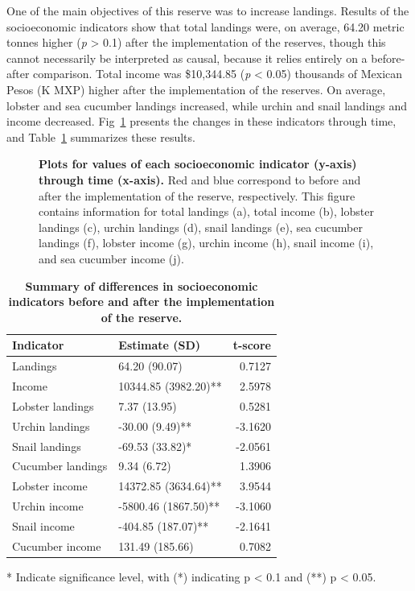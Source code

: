 \documentclass[10pt,letterpaper]{article}
\begin{document}
One of the main objectives of this reserve was to increase landings. Results of the socioeconomic indicators show that total landings were, on average, 64.20 metric tonnes higher (\emph{p} \textgreater{} 0.1) after the implementation of the reserves, though this cannot necessarily be interpreted as causal, because it relies entirely on a before-after comparison. Total income was \$10,344.85 (\emph{p} \textless{} 0.05) thousands of Mexican Pesos (K MXP) higher after the implementation of the reserves. On average, lobster and sea cucumber landings increased, while urchin and snail landings and income decreased. Fig~\ref{fig6} presents the changes in these indicators through time, and Table~\ref{table4} summarizes these results.

\begin{figure}[!h]
\caption{{\bf Plots for values of each socioeconomic indicator (y-axis) through time (x-axis).}
Red and blue correspond to before and after the implementation of the reserve, respectively. This figure contains information for total landings (a), total income (b), lobster landings (c), urchin landings (d), snail landings (e), sea cucumber landings (f), lobster income (g), urchin income (h), snail income (i), and sea cucumber income (j).}
\label{fig6}
\end{figure}

\begin{table}[!ht]
\centering
\caption{
{\bf Summary of differences in socioeconomic indicators before and after the implementation of the reserve.}}
\begin{tabular}{l|l|r}
\hline
\bfseries{Indicator} & \bfseries{Estimate (SD)} & \bfseries{t-score}\\
\hline
Landings & 64.20 (90.07) & 0.7127\\
\hline
Income & 10344.85 (3982.20)** & 2.5978\\
\hline
Lobster landings & 7.37 (13.95) & 0.5281\\
\hline
Urchin landings & -30.00 (9.49)** & -3.1620\\
\hline
Snail landings & -69.53 (33.82)* & -2.0561\\
\hline
Cucumber landings & 9.34 (6.72) & 1.3906\\
\hline
Lobster income & 14372.85 (3634.64)** & 3.9544\\
\hline
Urchin income & -5800.46 (1867.50)** & -3.1060\\
\hline
Snail income & -404.85 (187.07)** & -2.1641\\
\hline
Cucumber income & 131.49 (185.66) & 0.7082\\
\hline
\end{tabular}
\begin{flushleft} * Indicate significance level, with (*) indicating p \textless{} 0.1 and (**) p \textless{} 0.05.
\end{flushleft}
\label{table4}
\end{table}
\end{document}
